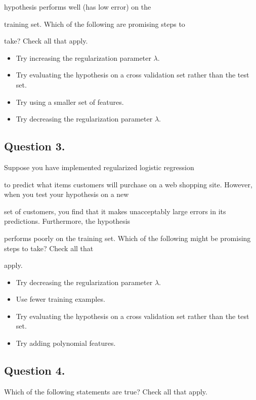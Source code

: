 \documentclass[11pt]{article} %
\begin{document}
hypothesis performs well (has low error) on the

training set. Which of the following are promising steps to

take? Check all that apply.

\begin{itemize}
\item 
Try increasing the regularization parameter $\lambda$.
\item 
Try evaluating the hypothesis on a cross validation set rather than the test set.
\item 
Try using a smaller set of features.
\item 
Try decreasing the regularization parameter $\lambda$.
\end{itemize}
\subsection*{Question 3. }
Suppose you have implemented regularized logistic regression

to predict what items customers will purchase on a web shopping site. However, when you test your hypothesis on a new

set of customers, you find that it makes unacceptably large errors in its predictions. Furthermore, the hypothesis

performs poorly on the training set. Which of the following might be promising steps to take? Check all that

apply.

\begin{itemize}
\item Try decreasing the regularization parameter $\lambda$.

\item Use fewer training examples.

\item Try evaluating the hypothesis on a cross validation set rather than the test set.

\item Try adding polynomial features.
\end{itemize}
\subsection*{Question 4. }
Which of the following statements are true? Check all that apply.
\end{document}
